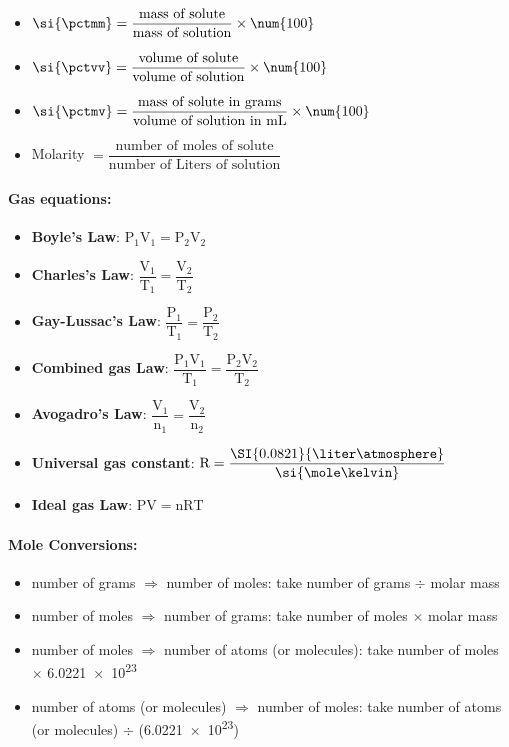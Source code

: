 \documentclass[9pt]{article}
\begin{document}
\begin{multicols}{2}
	\begin{itemize}
		\item  \( \si{\pctmm}  = \dfrac{\text{mass of solute}}{\text{mass of solution}} \times \num{100}  \)
		\item \(\si{\pctvv} = \dfrac{\text{volume of solute}}{\text{volume of solution}} \times \num{100} \)
		\item \(\si{\pctmv}= \dfrac{\text{mass of solute in grams}}{\text{volume of solution in mL}} \times \num{100} \)
		\item Molarity \(= \dfrac{\text{number of moles of solute}}{\text{number of Liters of solution}}\)
	\end{itemize}
	\vspace{0.5cm}
	
	\paragraph{\textsf{Gas equations:}}
	
	\begin{itemize}
		\item \textbf{Boyle's Law}:    \( \mathrm{P_1 V_1} = \mathrm{P_2 V_2}  \)
		\item \textbf{Charles's Law}: \(\dfrac{\mathrm{V_1}}{\mathrm{T_1}} = \mathrm{\dfrac{V_2}{T_2}}\)
		\item \textbf{Gay-Lussac's Law}: \(\mathrm{\dfrac{P_1}{T_1} = \dfrac{P_2}{T_2}} \)
		\item \textbf{Combined gas Law}: \(\mathrm{\dfrac{P_1 V_1}{T_1} = \dfrac{P_2 V_2}{T_2}} \)
		\item \textbf{Avogadro's Law}: \( \mathrm{\dfrac{V_1}{n_1} = \dfrac{V_2}{n_2}} \)
		\item \textbf{Universal gas constant}: \( \mathrm{R} = \dfrac{\SI{0.0821}{\liter \atmosphere}}{\si{\mole \kelvin}}  \)
		\item \textbf{Ideal gas Law}: \( \mathrm{PV = nRT} \)
	\end{itemize}
	
	
\end{multicols}

\paragraph{\textsf{Mole Conversions:}}
\begin{itemize}
	\item number of grams \( \Rightarrow \) number of moles: take number of grams \( \div \) molar mass
	\item number of moles \( \Rightarrow \) number of grams: take number of moles \( \times \) molar mass
	\item number of moles \( \Rightarrow \) number of atoms (or molecules): take number of moles \( \times \) \num{6.0221e23}
	\item number of atoms (or molecules) \( \Rightarrow \) number of moles: take number of atoms (or molecules) \( \div \) (\num{6.0221e23})
\end{itemize}
\end{document}
